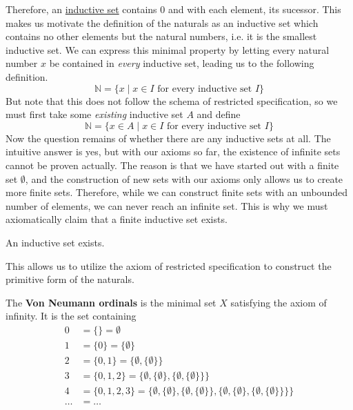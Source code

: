   Therefore, an \hyperref[def:inductive-set]{inductive set} contains $0$ and with each element, its sucessor. This makes us motivate the definition of the naturals as an inductive set which contains no other elements but the natural numbers, i.e. it is the smallest inductive set. We can express this minimal property by letting every natural number $x$ be contained in \textit{every} inductive set, leading us to the following definition. 
  \begin{equation}
    \mathbb{N} = \{x \mid x \in I \text{ for every inductive set } I \} 
  \end{equation}
  But note that this does not follow the schema of restricted specification, so we must first take some \textit{existing} inductive set $A$ and define 
  \begin{equation}
    \mathbb{N} = \{x \in A \mid x \in I \text{ for every inductive set } I \} 
  \end{equation} 
  Now the question remains of whether there are any inductive sets at all. The intuitive answer is yes, but with our axioms so far, the existence of infinite sets cannot be proven actually. The reason is that we have started out with a finite set $\emptyset$, and the construction of new sets with our axioms only allows us to create more finite sets. Therefore, while we can construct finite sets with an unbounded number of elements, we can never reach an infinite set. This is why we must axiomatically claim that a finite inductive set exists. 

  \begin{axiom}
    \label{thm:axiom-of-infinity}
    An inductive set exists. 
  \end{axiom}

  This allows us to utilize the axiom of restricted specification to construct the primitive form of the naturals. 

  \begin{definition}
    \label{def:von-neumann-ordinals}
 
     The \textbf{Von Neumann ordinals} is the minimal set $X$ satisfying the axiom of infinity. It is the set containing 
    \begin{align*}
      0 & = \{\} = \emptyset \\
      1 & = \{0\} = \{\emptyset\} \\
      2 & = \{0,1\} = \{\emptyset,\{\emptyset\}\} \\
      3 & = \{0,1,2\} = \{\emptyset,\{\emptyset\},\{\emptyset,\{\emptyset\}\}\} \\
      4 & = \{0,1,2,3\} = \{\emptyset,\{\emptyset\},\{\emptyset,\{\emptyset\}\},\{\emptyset,\{\emptyset\},\{\emptyset,\{\emptyset\}\}\}\} \\
      \ldots & = \ldots 
    \end{align*} 
  \end{definition} 

